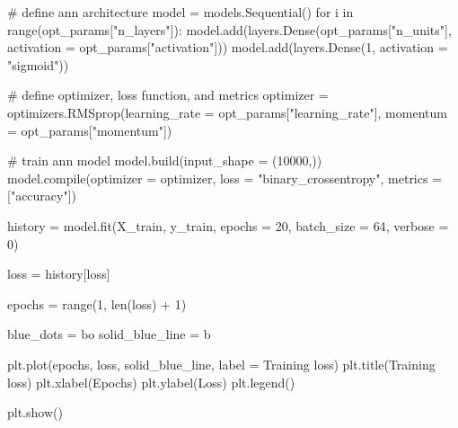 \documentclass[
  letterpaper,
  DIV=11,
  numbers=noendperiod]{scrreprt}
\newenvironment{Shaded}{\begin{snugshade}}{\end{snugshade}}
\newcommand{\BuiltInTok}[1]{\textcolor[rgb]{0.00,0.23,0.31}{#1}}
\newcommand{\CommentTok}[1]{\textcolor[rgb]{0.37,0.37,0.37}{#1}}
\newcommand{\ControlFlowTok}[1]{\textcolor[rgb]{0.00,0.23,0.31}{#1}}
\newcommand{\DecValTok}[1]{\textcolor[rgb]{0.68,0.00,0.00}{#1}}
\newcommand{\KeywordTok}[1]{\textcolor[rgb]{0.00,0.23,0.31}{#1}}
\newcommand{\NormalTok}[1]{\textcolor[rgb]{0.00,0.23,0.31}{#1}}
\newcommand{\OperatorTok}[1]{\textcolor[rgb]{0.37,0.37,0.37}{#1}}
\newcommand{\StringTok}[1]{\textcolor[rgb]{0.13,0.47,0.30}{#1}}
\begin{document}
\begin{Shaded}
\begin{Highlighting}[]
\CommentTok{\# define ann architecture}
\NormalTok{model }\OperatorTok{=}\NormalTok{ models.Sequential()}
\ControlFlowTok{for}\NormalTok{ i }\KeywordTok{in} \BuiltInTok{range}\NormalTok{(opt\_params[}\StringTok{"n\_layers"}\NormalTok{]):}
\NormalTok{    model.add(layers.Dense(opt\_params[}\StringTok{"n\_units"}\NormalTok{], activation }\OperatorTok{=}\NormalTok{ opt\_params[}\StringTok{"activation"}\NormalTok{]))}
\NormalTok{model.add(layers.Dense(}\DecValTok{1}\NormalTok{, activation }\OperatorTok{=} \StringTok{"sigmoid"}\NormalTok{))}

\CommentTok{\# define optimizer, loss function, and metrics}
\NormalTok{optimizer }\OperatorTok{=}\NormalTok{ optimizers.RMSprop(learning\_rate }\OperatorTok{=}\NormalTok{ opt\_params[}\StringTok{"learning\_rate"}\NormalTok{], }
\NormalTok{                               momentum }\OperatorTok{=}\NormalTok{ opt\_params[}\StringTok{"momentum"}\NormalTok{])}

\CommentTok{\# train ann model}
\NormalTok{model.build(input\_shape }\OperatorTok{=}\NormalTok{ (}\DecValTok{10000}\NormalTok{,))}
\NormalTok{model.}\BuiltInTok{compile}\NormalTok{(optimizer }\OperatorTok{=}\NormalTok{ optimizer, loss }\OperatorTok{=} \StringTok{"binary\_crossentropy"}\NormalTok{, metrics }\OperatorTok{=}\NormalTok{ [}\StringTok{"accuracy"}\NormalTok{])}

\NormalTok{history }\OperatorTok{=}\NormalTok{ model.fit(X\_train, y\_train, epochs }\OperatorTok{=} \DecValTok{20}\NormalTok{, batch\_size }\OperatorTok{=} \DecValTok{64}\NormalTok{, verbose }\OperatorTok{=} \DecValTok{0}\NormalTok{)}
\end{Highlighting}
\end{Shaded}

\begin{Shaded}
\begin{Highlighting}[]
\NormalTok{loss }\OperatorTok{=}\NormalTok{ history[}\StringTok{\textquotesingle{}loss\textquotesingle{}}\NormalTok{]}

\NormalTok{epochs }\OperatorTok{=} \BuiltInTok{range}\NormalTok{(}\DecValTok{1}\NormalTok{, }\BuiltInTok{len}\NormalTok{(loss) }\OperatorTok{+} \DecValTok{1}\NormalTok{)}

\NormalTok{blue\_dots }\OperatorTok{=} \StringTok{\textquotesingle{}bo\textquotesingle{}}
\NormalTok{solid\_blue\_line }\OperatorTok{=} \StringTok{\textquotesingle{}b\textquotesingle{}}

\NormalTok{plt.plot(epochs, loss, solid\_blue\_line, label }\OperatorTok{=} \StringTok{\textquotesingle{}Training loss\textquotesingle{}}\NormalTok{)}
\NormalTok{plt.title(}\StringTok{\textquotesingle{}Training loss\textquotesingle{}}\NormalTok{)}
\NormalTok{plt.xlabel(}\StringTok{\textquotesingle{}Epochs\textquotesingle{}}\NormalTok{)}
\NormalTok{plt.ylabel(}\StringTok{\textquotesingle{}Loss\textquotesingle{}}\NormalTok{)}
\NormalTok{plt.legend()}

\NormalTok{plt.show()}
\end{Highlighting}
\end{Shaded}
\end{document}
